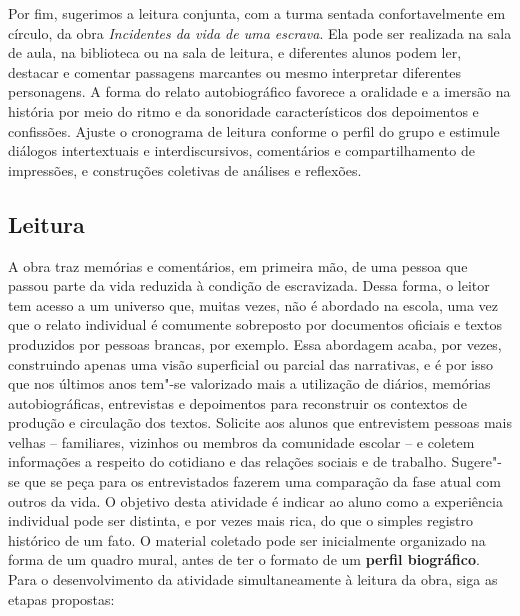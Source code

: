 \documentclass[12pt]{extarticle}
\begin{document}
Por fim, sugerimos a leitura conjunta, com a turma sentada
confortavelmente em círculo, da obra \emph{Incidentes da vida de uma
escrava}. Ela pode ser realizada na sala de aula, na biblioteca ou na
sala de leitura, e diferentes alunos podem ler, destacar e comentar
passagens marcantes ou mesmo interpretar diferentes personagens. A forma
do relato autobiográfico favorece a oralidade e a imersão na história
por meio do ritmo e da sonoridade característicos dos depoimentos e
confissões. Ajuste o cronograma de leitura conforme o perfil do grupo e
estimule diálogos intertextuais e interdiscursivos, comentários e
compartilhamento de impressões, e construções coletivas de análises e
reflexões.

\subsection{Leitura}

\bnccativividadesleitura


A obra traz memórias e comentários, em primeira mão, de uma
pessoa que passou parte da vida reduzida à condição de escravizada.
Dessa forma, o leitor tem acesso a um universo que, muitas vezes, não é
abordado na escola, uma vez que o relato individual é comumente
sobreposto por documentos oficiais e textos produzidos por pessoas
brancas, por exemplo. Essa abordagem acaba, por vezes, construindo
apenas uma visão superficial ou parcial das narrativas, e é por isso que
nos últimos anos tem"-se valorizado mais a utilização de diários,
memórias autobiográficas, entrevistas e depoimentos para reconstruir os
contextos de produção e circulação dos textos. Solicite aos alunos que
entrevistem pessoas mais velhas -- familiares, vizinhos ou membros da
comunidade escolar -- e coletem informações a respeito do cotidiano e
das relações sociais e de trabalho. Sugere"-se que se peça para os
entrevistados fazerem uma comparação da fase atual com outros da vida. O
objetivo desta atividade é indicar ao aluno como a experiência
individual pode ser distinta, e por vezes mais rica, do que o simples
registro histórico de um fato. O material coletado pode ser inicialmente
organizado na forma de um quadro mural, antes de ter o formato de um
\textbf{perfil biográfico}. Para o desenvolvimento da atividade
simultaneamente à leitura da obra, siga as etapas propostas:
\end{document}
